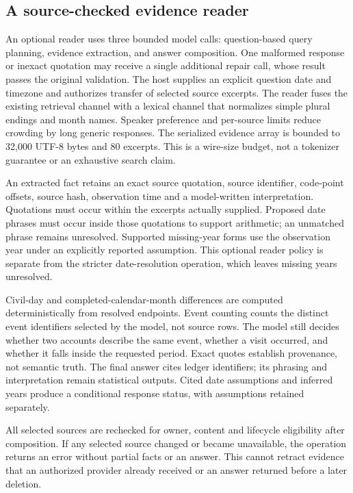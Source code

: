 \documentclass[11pt]{article}
\begin{document}
\subsection{A source-checked evidence reader}
An optional reader uses three bounded model calls: question-based query planning, evidence extraction, and answer composition. One malformed response or inexact quotation may receive a single additional repair call, whose result passes the original validation. The host supplies an explicit question date and timezone and authorizes transfer of selected source excerpts. The reader fuses the existing retrieval channel with a lexical channel that normalizes simple plural endings and month names. Speaker preference and per-source limits reduce crowding by long generic responses. The serialized evidence array is bounded to 32,000 UTF-8 bytes and 80 excerpts. This is a wire-size budget, not a tokenizer guarantee or an exhaustive search claim.

An extracted fact retains an exact source quotation, source identifier, code-point offsets, source hash, observation time and a model-written interpretation. Quotations must occur within the excerpts actually supplied. Proposed date phrases must occur inside those quotations to support arithmetic; an unmatched phrase remains unresolved. Supported missing-year forms use the observation year under an explicitly reported assumption. This optional reader policy is separate from the stricter date-resolution operation, which leaves missing years unresolved.

Civil-day and completed-calendar-month differences are computed deterministically from resolved endpoints. Event counting counts the distinct event identifiers selected by the model, not source rows. The model still decides whether two accounts describe the same event, whether a visit occurred, and whether it falls inside the requested period. Exact quotes establish provenance, not semantic truth. The final answer cites ledger identifiers; its phrasing and interpretation remain statistical outputs. Cited date assumptions and inferred years produce a conditional response status, with assumptions retained separately.

All selected sources are rechecked for owner, content and lifecycle eligibility after composition. If any selected source changed or became unavailable, the operation returns an error without partial facts or an answer. This cannot retract evidence that an authorized provider already received or an answer returned before a later deletion.
\end{document}
